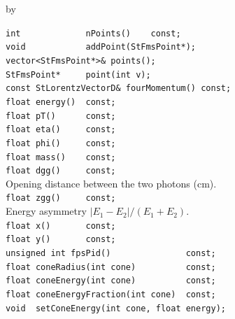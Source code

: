 \documentclass[twoside]{article}
\newcommand{\entrylabel}[1]{\mbox{\textbf{{#1}}}\hfil}%
\newenvironment{entry}
{\begin{list}{}%
    {\renewcommand{\makelabel}{\entrylabel}%
     \setlength{\labelwidth}{90pt}%
     \setlength{\leftmargin}{\labelwidth}
     \advance\leftmargin by \labelsep%
      }%
    }%
  {\end{list}}
\newcommand{\Entrylabel}[1]%
{\raisebox{0pt}[1ex][0pt]{\makebox[\labelwidth][l]%
    {\parbox[t]{\labelwidth}{\hspace{0pt}\textbf{{#1}}}}}}
\newenvironment{Entry}%
{\renewcommand{\entrylabel}{\Entrylabel}\begin{entry}}%
  {\end{entry}}
\begin{document}
\begin{Entry}
\item[Public Member\\ Functions]
    \verb+int             nPoints()    const;+\\
    \verb+void            addPoint(StFmsPoint*);+\\
    \verb+vector<StFmsPoint*>& points();+\\
    \verb+StFmsPoint*     point(int v);+\\
    \verb+const StLorentzVectorD& fourMomentum() const;+\\
    \verb+float energy()  const;+\\
    \verb+float pT()      const;+\\
    \verb+float eta()     const;+\\
    \verb+float phi()     const;+\\
    \verb+float mass()    const;+\\
    \verb+float dgg()     const;+\\
        Opening distance between the two photons (cm).\\
    \verb+float zgg()     const;+\\
        Energy asymmetry $|E_1-E_2|/(E_1+E_2)$.\\
    \verb+float x()       const;+\\
    \verb+float y()       const;+\\
    \verb+unsigned int fpsPid()               const;+\\
    \verb+float coneRadius(int cone)          const;+\\
    \verb+float coneEnergy(int cone)          const;+\\
    \verb+float coneEnergyFraction(int cone)  const;+\\
    \verb+void  setConeEnergy(int cone, float energy);+\\
\end{Entry}
\clearpage

\end{document}

